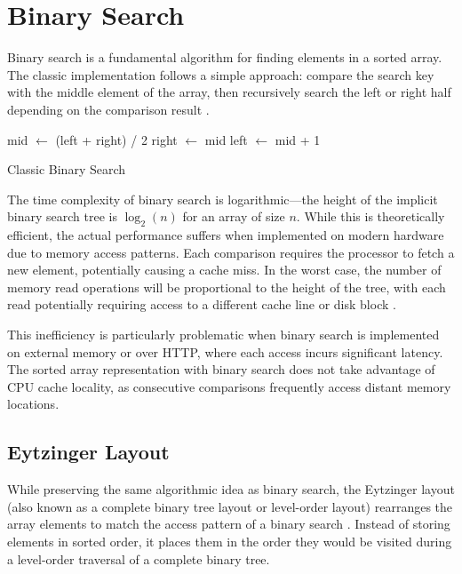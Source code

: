 \section{Binary Search}
\label{tb:binary_search}

Binary search is a fundamental algorithm for finding elements in a sorted array. The classic implementation follows a simple approach: compare the search key with the middle element of the array, then recursively search the left or right half depending on the comparison result \citep{binary_search}.
\begin{algorithm}
  \BlankLine
  {
    mid $\leftarrow$ (left + right) / 2\;
    {
      right $\leftarrow$ mid\;
    }
    \Else
    {
      left $\leftarrow$ mid + 1\;
    }
  }
  \caption{Classic Binary Search}%
\label{alg:binary_search}
\end{algorithm}

The time complexity of binary search is logarithmic—the height of the implicit binary search tree is $\log_2(n)$ for an array of size $n$. While this is theoretically efficient, the actual performance suffers when implemented on modern hardware due to memory access patterns. Each comparison requires the processor to fetch a new element, potentially causing a cache miss. In the worst case, the number of memory read operations will be proportional to the height of the tree, with each read potentially requiring access to a different cache line or disk block \citep{binary_search}.

This inefficiency is particularly problematic when binary search is implemented on external memory or over HTTP, where each access incurs significant latency. The sorted array representation with binary search does not take advantage of CPU cache locality, as consecutive comparisons frequently access distant memory locations.

\subsection{Eytzinger Layout}
\label{tb:eytzinger_layout}

While preserving the same algorithmic idea as binary search, the Eytzinger layout (also known as a complete binary tree layout or level-order layout) rearranges the array elements to match the access pattern of a binary search \citep{binary_search}. Instead of storing elements in sorted order, it places them in the order they would be visited during a level-order traversal of a complete binary tree.

